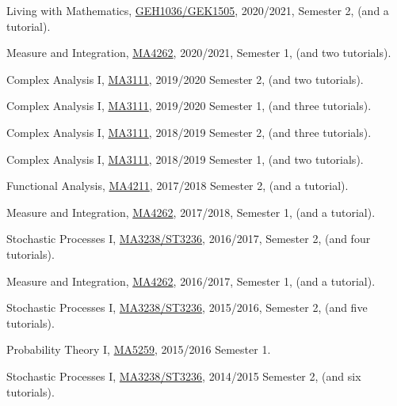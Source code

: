 \begin{item_list}
\item
  Living with Mathematics, \href{https://wangd-math.github.io/teaching/GEH1036_GEK1505_S21/index.html}{GEH1036/GEK1505}, 2020/2021, Semester 2, (and a tutorial).
\item
  Measure and Integration, \href{https://wangd-math.github.io/teaching/MA4262_F20/index.html}{MA4262}, 2020/2021, Semester 1, (and two tutorials).
\item
  Complex Analysis I, \href{https://wangd-math.github.io/teaching/MA3111_S20/index.html}{MA3111}, 2019/2020 Semester 2, (and two tutorials).
\item
  Complex Analysis I, \href{https://wangd-math.github.io/teaching/MA3111_F19/index.html}{MA3111}, 2019/2020 Semester 1, (and three tutorials).
\item
  Complex Analysis I, \href{https://wangd-math.github.io/teaching/MA3111_S19/index.html}{MA3111}, 2018/2019 Semester 2, (and three tutorials).
\item
  Complex Analysis I, \href{https://wangd-math.github.io/teaching/MA3111_F18/index.html}{MA3111}, 2018/2019 Semester 1, (and two tutorials).
\item
  Functional Analysis, \href{https://wangd-math.github.io/teaching/MA4211_S18/index.html}{MA4211}, 2017/2018 Semester 2, (and a tutorial).
\item
  Measure and Integration, \href{https://wangd-math.github.io/teaching/MA4262_F17/index.html}{MA4262}, 2017/2018, Semester 1, (and a tutorial).
\item
  Stochastic Processes I, \href{https://wangd-math.github.io/teaching/MA3238_ST3236_S17/index.html}{MA3238/ST3236}, 2016/2017, Semester 2, (and four tutorials).
\item
  Measure and Integration, \href{https://wangd-math.github.io/teaching/MA4262_F16/index.html}{MA4262}, 2016/2017, Semester 1, (and a tutorial).
\item
  Stochastic Processes I, \href{https://wangd-math.github.io/teaching/MA3238_ST3236_S16/index.html}{MA3238/ST3236}, 2015/2016, Semester 2, (and five tutorials).
\item
  Probability Theory I, \href{https://wangd-math.github.io/teaching/MA5259_F15/index.html}{MA5259}, 2015/2016 Semester 1.
\item
  Stochastic Processes I, \href{https://wangd-math.github.io/teaching/MA3238_ST3236_S15/index.html}{MA3238/ST3236}, 2014/2015 Semester 2, (and six tutorials).
\item

\end{item_list}
